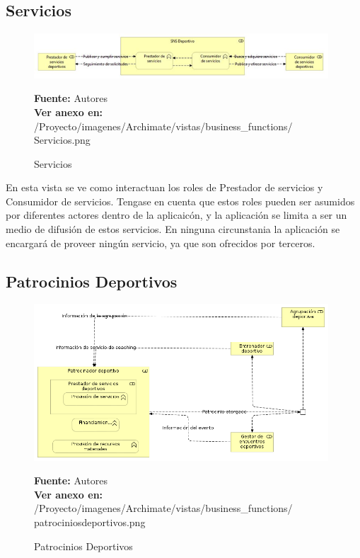 \subsection{Servicios}

\begin{figure}[!htb]
  \begin{center}
    \includegraphics[width=11cm]{./imagenes/Archimate/vistas/business_functions/Servicios.png}
    \caption{Servicios}
    \label{fig:BF_Servicios}
    \textbf{Fuente:}  Autores \\
    \textbf{Ver anexo en:} /Proyecto/imagenes/Archimate/vistas/business\_functions/
    Servicios.png
  \end{center}
\end{figure}

En esta vista se ve como interactuan los roles de Prestador de servicios y Consumidor de servicios. Tengase en cuenta que estos roles pueden ser asumidos por diferentes actores dentro de la aplicaicón, y la aplicación se limita a ser un medio de difusión de estos servicios. En ninguna circunstania la aplicación se encargará de proveer ningún servicio, ya que son ofrecidos por terceros.

\subsection{Patrocinios Deportivos}

\begin{figure}[!htb]
  \begin{center}
    \includegraphics[width=11cm]{./imagenes/Archimate/vistas/business_functions/patrociniosdeportivos.png}
    \caption{Patrocinios Deportivos}
    \label{fig:bf_patrocinios_deportivos}
    \textbf{Fuente:}  Autores
     \\
    \textbf{Ver anexo en:} /Proyecto/imagenes/Archimate/vistas/business\_functions/
    patrociniosdeportivos.png
  \end{center}
\end{figure}

